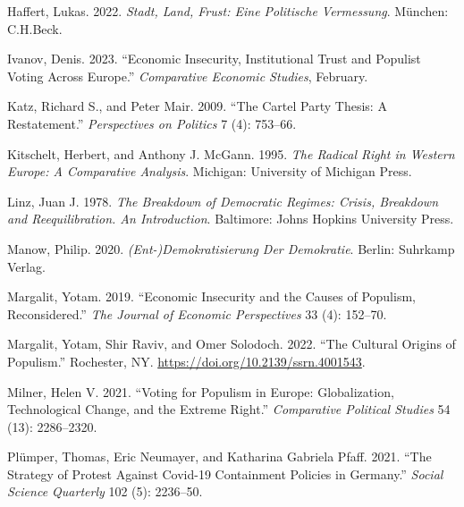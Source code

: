 \documentclass[
]{article}
\newlength{\cslhangindent}
\newlength{\cslentryspacingunit} %
\newenvironment{CSLReferences}[2] %
 {%
  \setlength{\parindent}{0pt}
  \ifodd #1
  \let\oldpar\par
  \def\par{\hangindent=\cslhangindent\oldpar}
  \fi
  \setlength{\parskip}{#2\cslentryspacingunit}
 }%
 {}
\begin{document}
\begin{CSLReferences}{1}{0}
\leavevmode{}%
Haffert, Lukas. 2022. \emph{Stadt, {Land}, {Frust}: {Eine} Politische
{Vermessung}}. München: C.H.Beck.

\leavevmode{}%
Ivanov, Denis. 2023. {``Economic {Insecurity}, {Institutional} {Trust}
and {Populist} {Voting} {Across} {Europe}.''} \emph{Comparative Economic
Studies}, February.

\leavevmode{}%
Katz, Richard S., and Peter Mair. 2009. {``The {Cartel} {Party}
{Thesis}: {A} {Restatement}.''} \emph{Perspectives on Politics} 7 (4):
753--66.

\leavevmode{}%
Kitschelt, Herbert, and Anthony J. McGann. 1995. \emph{The {Radical}
{Right} in {Western} {Europe}: {A} {Comparative} {Analysis}}. Michigan:
University of Michigan Press.

\leavevmode{}%
Linz, Juan J. 1978. \emph{The {Breakdown} of {Democratic} {Regimes}:
{Crisis}, {Breakdown} and {Reequilibration}. {An} {Introduction}}.
Baltimore: Johns Hopkins University Press.

\leavevmode{}%
Manow, Philip. 2020. \emph{({Ent}-){Demokratisierung} Der {Demokratie}}.
Berlin: Suhrkamp Verlag.

\leavevmode{}%
Margalit, Yotam. 2019. {``Economic {Insecurity} and the {Causes} of
{Populism}, {Reconsidered}.''} \emph{The Journal of Economic
Perspectives} 33 (4): 152--70.

\leavevmode{}%
Margalit, Yotam, Shir Raviv, and Omer Solodoch. 2022. {``The {Cultural}
{Origins} of {Populism}.''} Rochester, NY.
\url{https://doi.org/10.2139/ssrn.4001543}.

\leavevmode{}%
Milner, Helen V. 2021. {``Voting for {Populism} in {Europe}:
{Globalization}, {Technological} {Change}, and the {Extreme} {Right}.''}
\emph{Comparative Political Studies} 54 (13): 2286--2320.

\leavevmode{}%
Plümper, Thomas, Eric Neumayer, and Katharina Gabriela Pfaff. 2021.
{``The Strategy of Protest Against {Covid}-19 Containment Policies in
{Germany}.''} \emph{Social Science Quarterly} 102 (5): 2236--50.


\end{CSLReferences}
\end{document}
